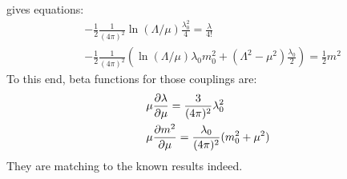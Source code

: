 gives equations:
\begin{align}
    &-\frac{1}{2} \frac{1}{(4\pi)^{2}} \ln (\Lambda / \mu) \frac{\lambda _{0} ^{2}}{4} = \frac{\lambda}{4!} \\
    &-\frac{1}{2} \frac{1}{(4\pi)^{2}} (\ln (\Lambda / \mu) \lambda _{0} m_{0}^{2} + (\Lambda ^{2} - \mu ^{2}) \frac{\lambda _{0}}{2}) = \frac{1}{2} m^{2} 
\end{align}
To this end, beta functions for those couplings are:
\begin{align}
    &\mu \pdv{\lambda}{\mu} = \frac{3}{(4\pi)^{2}} \lambda _{0} ^{2}\\
    &\mu \pdv{m^{2}}{\mu} = \frac{\lambda _{0}}{(4\pi)^{2}} (m_{0}^{2} + \mu ^{2})
\end{align}
They are matching to the known results \parencite{srednicki_quantum_2007,anselmi_introduction_2009, peskin_introduction_1995} indeed.